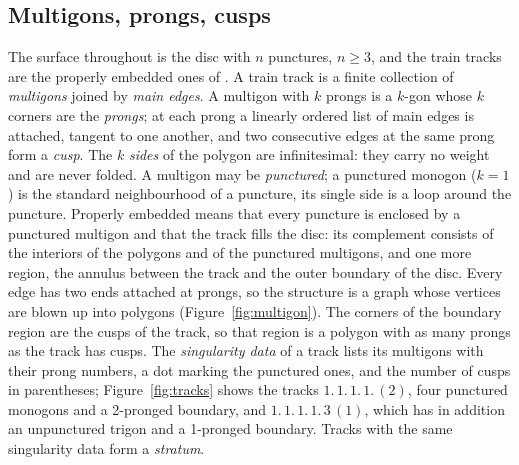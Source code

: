 \documentclass[12pt]{amsart}
\newcommand{\np}{n}                       %
\theoremstyle{plain}
\theoremstyle{definition}
\begin{document}
\subsection{Multigons, prongs, cusps}
The surface throughout is the disc with $\np$ punctures, $\np\ge3$, and
the train tracks are the properly embedded ones of \cite{Lanneau2011}.
A train track is a finite collection of \emph{multigons} joined by
\emph{main edges}.  A multigon with $k$ prongs is a $k$-gon whose $k$
corners are the \emph{prongs}; at each prong a linearly ordered list of
main edges is attached, tangent to one another, and two consecutive
edges at the same prong form a \emph{cusp}.  The $k$ \emph{sides} of the
polygon are infinitesimal: they carry no weight and are never folded.  A
multigon may be \emph{punctured}; a punctured monogon ($k=1$) is the
standard neighbourhood of a puncture, its single side is a loop around
the puncture.  Properly embedded means that every puncture is enclosed
by a punctured multigon and that the track fills the disc: its
complement consists of the interiors of the polygons and of the punctured
multigons, and one more region, the annulus between the track and the
outer boundary of the disc.  Every edge has two ends attached at prongs,
so the structure is a graph whose vertices are blown up into polygons
(Figure~\ref{fig:multigon}).  The corners of the boundary region are the
cusps of the track, so that region is a polygon with as many prongs as
the track has cusps.  The \emph{singularity data} of a track lists its
multigons with their prong numbers, a dot marking the punctured ones,
and the number of cusps in parentheses; Figure~\ref{fig:tracks} shows
the tracks $1.\,1.\,1.\,1.\,(2)$, four punctured monogons and a
2-pronged boundary, and $1.\,1.\,1.\,1.\,3\,(1)$, which has in addition
an unpunctured trigon and a 1-pronged boundary.  Tracks with the same
singularity data form a \emph{stratum}.
\end{document}
